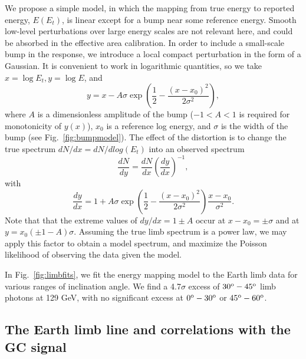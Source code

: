 \documentclass[aps,twocolumn,prd,superscriptaddress,showpacs,nofootinbib,fixfloat]{revtex4}
\newcommand{\be}{\begin{equation}}
\newcommand{\ee}{\end{equation}}
\newcommand{\degree}{^{\rm o}}
\begin{document}
We propose a simple model, in
which the mapping from true energy to reported energy,
$E(E_t)$, is linear except for a bump near some reference
energy.  Smooth low-level perturbations over large energy
scales are not relevant here, and could be absorbed in the
effective area calibration.  In order to include a
small-scale bump in the response, we introduce a local
compact perturbation in the form of a Gaussian.  It is
convenient to work in logarithmic quantities, so we take
$x=\log E_t, y=\log E$, and \be
\label{eq:yofx}
y=x - A\sigma \exp\left(\frac{1}{2}-\frac{(x-x_0)^2}{2\sigma^2}\right),
\ee
where $A$ is a dimensionless amplitude of the bump ($-1<A<1$
is required for monotonicity of $y(x)$), $x_0$ is a
reference log energy, and $\sigma$ is the width of the bump (see
Fig.~\ref{fig:bumpmodel}).  The effect of the distortion is
to change the true spectrum $dN/dx = dN/dlog(E_t)$ into an
observed spectrum
\be
\label{eq:dndy}
\frac{dN}{dy} = \frac{dN}{dx} \left(\frac{dy}{dx}\right)^{-1} ,
\ee
with
\be
\label{eq:dydx}
\frac{dy}{dx} = 1 + A\sigma \exp\left(\frac{1}{2}-\frac{(x-x_0)^2}{2\sigma^2}\right)
\frac{x-x_0}{\sigma^2}.
\ee
Note that that the extreme values of $dy/dx = 1 \pm A$ occur
at $x-x_0 = \pm \sigma$ and at $y=x_0(\pm1-A)\sigma$.
Assuming the true limb spectrum is a power law, we may apply
this factor to obtain a model spectrum, and maximize the
Poisson likelihood of observing the data given the model.


In Fig.~\ref{fig:limbfits}, we fit the energy mapping model
to the Earth limb data for various ranges of inclination
angle. We find a 4.7$\sigma$ excess of $30\degree-45\degree$
limb photons at 129 GeV, with no significant excess at $0\degree - 30\degree$
or $45\degree - 60\degree$. 

\subsection{The Earth limb line and correlations with the GC signal}
\end{document}
